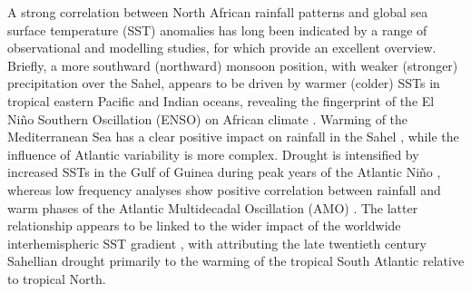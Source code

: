 \documentclass[a4paper]{article}
\begin{document}
A strong correlation between North African rainfall patterns and global sea surface temperature (SST) anomalies has long been indicated by a range of observational and modelling studies, for which \citeauthor{rodriguez2015variability} \parencite{rodriguez2015variability} provide an excellent overview. %
Briefly, a more southward (northward) monsoon position, with weaker (stronger) precipitation over the Sahel, appears to be driven by warmer (colder) SSTs in tropical eastern Pacific \parencite{rowell1995variability, fontaine1996sea, rowell2001teleconnections, janicot2001summer, giannini2003oceanic} and Indian \parencite{rowell1995variability, fontaine1996sea, bader2003impact, giannini2003oceanic} oceans, revealing the fingerprint of the El Ni\~{n}o Southern Oscillation (ENSO) on African climate \parencite{janowiak1988investigation, rowell1995variability, ward1998diagnosis}.
Warming of the Mediterranean Sea has a clear positive impact on rainfall in the Sahel \parencite{rowell2003impact, gaetani2010influence, fontaine2010impacts}, while the influence of Atlantic variability is more complex.
Drought is intensified by increased SSTs in the Gulf of Guinea during peak years of the Atlantic Ni\~{n}o \parencite{lamb1978case, bah1987towards, rowell1995variability, fontaine1996sea, ward1998diagnosis, giannini2003oceanic}, whereas low frequency analyses show positive correlation between rainfall and warm phases of the Atlantic Multidecadal Oscillation (AMO) \parencite{zhang2006impact, martin2014impact}.
The latter relationship appears to be linked to the wider impact of the worldwide interhemispheric SST gradient \parencite{folland1986sahel, lamb1978large, rowell1995variability, fontaine1998evolution}, with \citeauthor{hoerling2006detection} \parencite{hoerling2006detection} attributing the late twentieth century Sahellian drought primarily to the warming of the tropical South Atlantic relative to tropical North. 
\end{document}
